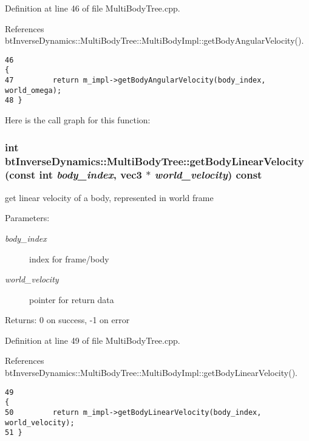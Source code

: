 Definition at line 46 of file MultiBodyTree.cpp.

References btInverseDynamics::MultiBodyTree::MultiBodyImpl::getBodyAngularVelocity().

\begin{Code}\begin{verbatim}46                                                                                        {
47         return m_impl->getBodyAngularVelocity(body_index, world_omega);
48 }
\end{verbatim}
\end{Code}




Here is the call graph for this function:\hypertarget{classbt_inverse_dynamics_1_1_multi_body_tree_c8076ba03722eb2744d1cccd09bfeb41}{
\subsubsection[getBodyLinearVelocity]{\setlength{\rightskip}{0pt plus 5cm}int btInverseDynamics::MultiBodyTree::getBodyLinearVelocity (const int {\em body\_\-index}, \/  {\bf vec3} $\ast$ {\em world\_\-velocity}) const}}
\label{classbt_inverse_dynamics_1_1_multi_body_tree_c8076ba03722eb2744d1cccd09bfeb41}


get linear velocity of a body, represented in world frame \begin{Desc}
\item[Parameters:]
\begin{description}
\item[{\em body\_\-index}]index for frame/body \item[{\em world\_\-velocity}]pointer for return data \end{description}
\end{Desc}
\begin{Desc}
\item[Returns:]0 on success, -1 on error \end{Desc}


Definition at line 49 of file MultiBodyTree.cpp.

References btInverseDynamics::MultiBodyTree::MultiBodyImpl::getBodyLinearVelocity().

\begin{Code}\begin{verbatim}49                                                                                          {
50         return m_impl->getBodyLinearVelocity(body_index, world_velocity);
51 }
\end{verbatim}
\end{Code}




